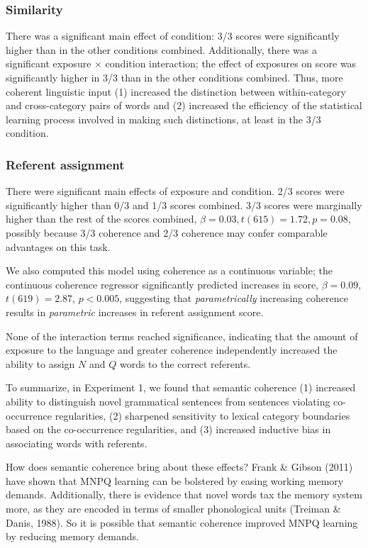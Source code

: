 \documentclass[man,floatsintext]{apa6}
\begin{document}
\subsubsection{Similarity}
There was a significant main effect of condition: 3/3 scores were significantly higher than in the other conditions combined. Additionally, there was a significant exposure $\times$ condition interaction; the effect of exposures on score was significantly higher in 3/3 than in the other conditions combined. Thus, more coherent linguistic input (1) increased the distinction between within-category and cross-category pairs of words and (2) increased the efficiency of the statistical learning process involved in making such distinctions, at least in the 3/3 condition.

\subsubsection{Referent assignment}

There were significant main effects of exposure and condition. 2/3 scores were significantly higher than 0/3 and 1/3 scores combined. 3/3 scores were marginally higher than the rest of the scores combined, $\beta = 0.03, t(615) = 1.72, p = 0.08$, possibly because 3/3 coherence and 2/3 coherence may confer comparable advantages on this task.

We also computed this model using coherence as a continuous variable; the continuous coherence regressor significantly predicted increases in score, $\beta = 0.09$, $t(619) = 2.87$, $p < 0.005$, suggesting that \emph{parametrically} increasing coherence results in \emph{parametric} increases in referent assignment score.

None of the interaction terms reached significance, indicating that the amount of exposure to the language and greater coherence independently increased the ability to assign $N$ and $Q$ words to the correct referents. 


To summarize, in Experiment 1, we found that semantic coherence (1) increased ability to distinguish novel grammatical sentences from sentences violating co-occurrence regularities, (2) sharpened sensitivity to lexical category boundaries based on the co-occurrence regularities, and (3) increased inductive bias in associating words with referents.

How does semantic coherence bring about these effects? Frank \& Gibson (2011) have shown that MNPQ learning can be bolstered by easing working memory demands. Additionally, there is evidence that novel words tax the memory system more, as they are encoded in terms of smaller phonological units (Treiman \& Danis, 1988). So it is possible that semantic coherence improved MNPQ learning by reducing memory demands.
\end{document}
